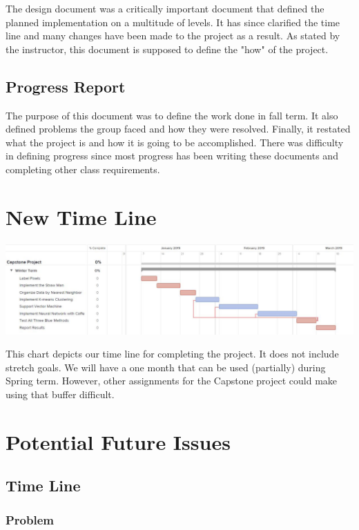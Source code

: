 \documentclass[12pt,journal,compsoc, draftclsnofoot,onecolumn]{IEEEtran}
\begin{document}
The design document was a critically important document that defined the planned implementation on a multitude of levels.
It has since clarified the time line and many changes have been made to the project as a result.
As stated by the instructor, this document is supposed to define the "how" of the project.


\subsection{Progress Report}

The purpose of this document was to define the work done in fall term.
It also defined problems the group faced and how they were resolved.
Finally, it restated what the project is and how it is going to be accomplished.
There was difficulty in defining progress since most progress has been writing these documents and completing other class requirements.


\section{New Time Line}

\includegraphics[width=\textwidth]{ganttChart.JPG}

\noindent
This chart depicts our time line for completing the project.
It does not include stretch goals.
We will have a one month that can be used (partially) during Spring term.
However, other assignments for the Capstone project could make using that buffer difficult.


\newpage
\section{Potential Future Issues}

\subsection{Time Line}

\subsubsection{Problem}
\end{document}
